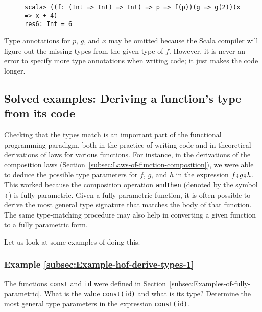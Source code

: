 \begin{wrapfigure}{l}{0.69\columnwidth}%
\vspace{-0.75\baselineskip}
\begin{lstlisting}
scala> ((f: (Int => Int) => Int) => p => f(p))(g => g(2))(x => x + 4)
res6: Int = 6
\end{lstlisting}
\vspace{-1\baselineskip}
\end{wrapfigure}%

\noindent Type annotations for $p$, $g$, and $x$ may be omitted
because the Scala compiler will figure out the missing types from
the given type of $f$. However, it is never an error to specify more
type annotations when writing code; it just makes the code longer.

\subsection{Solved examples: Deriving a function's type from its code}

Checking that the types match is an important part of the functional
programming paradigm, both in the practice of writing code and in
theoretical derivations of laws for various functions. For instance,
in the derivations of the composition laws (Section~\ref{subsec:Laws-of-function-composition}),
we were able to deduce the possible type parameters for $f$, $g$,
and $h$ in the expression $f\bef g\bef h$. This worked because the
composition operation \lstinline!andThen! (denoted by the symbol
$\bef$) is fully parametric. Given a fully parametric function, it
is often possible to derive the most general type signature that matches
the body of that function. The same type-matching procedure may also
help in converting a given function to a fully parametric form.

Let us look at some examples of doing this.

\subsubsection{Example \label{subsec:Example-hof-derive-types-1}\ref{subsec:Example-hof-derive-types-1}}

The functions \lstinline!const! and \lstinline!id! were defined
in Section~\ref{subsec:Examples-of-fully-parametric}. What is the
value \lstinline!const(id)! and what is its type? Determine the most
general type parameters in the expression \lstinline!const(id)!.

